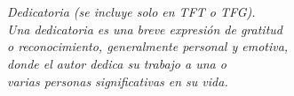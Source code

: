 \chapter*{} 
\vfill %
\hfill %
\begin{minipage}{\textwidth}
\raggedleft %
\it{Dedicatoria (se incluye solo en TFT o TFG).\\
Una dedicatoria es una breve expresión de gratitud\\
o reconocimiento, generalmente personal y emotiva,\\ 
donde el autor dedica su trabajo a una o\\
varias personas significativas en su vida.}
\end{minipage}
\addtocounter{page}{-1} 